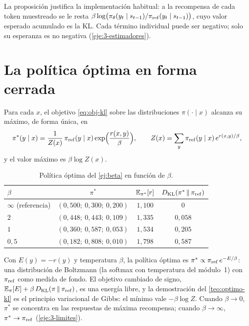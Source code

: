 La proposición justifica la implementación habitual: a la recompensa de cada token muestreado se le resta $\beta\log\bigl(\pi_\theta(y_t\mid s_{t-1})/\pi_{\mathrm{ref}}(y_t\mid s_{t-1})\bigr)$, cuyo valor esperado acumulado es la KL. Cada término individual puede ser negativo; solo su esperanza es no negativa (\cref{eje:3-estimadores}).

\addtocounter{definicion}{1}%

\section{La política óptima en forma cerrada}

\begin{teorema}\label{teo:optimo-kl}
Para cada $x$, el objetivo \eqref{eq:obj-kl} sobre las distribuciones $\pi(\cdot\mid x)$ alcanza su máximo, de forma única, en
\[
\pi^{*}(y\mid x)=\frac{1}{Z(x)}\,\pi_{\mathrm{ref}}(y\mid x)\exp\Bigl(\frac{r(x,y)}{\beta}\Bigr),\qquad Z(x)=\sum_{y}\pi_{\mathrm{ref}}(y\mid x)\,e^{r(x,y)/\beta},
\]
y el valor máximo es $\beta\log Z(x)$.
\end{teorema}

\addtocounter{definicion}{1}%

\begin{table}[h]
\centering\small
\begin{tabular}{@{}lccc@{}}
\toprule
$\beta$ & $\pi^{*}$ & $\mathbb{E}_{\pi^{*}}[r]$ & $D_{\mathrm{KL}}(\pi^{*}\,\|\,\pi_{\mathrm{ref}})$ \\
\midrule
$\infty$ (referencia) & $(0{,}500;\ 0{,}300;\ 0{,}200)$ & $1{,}100$ & $0$ \\
$2$ & $(0{,}448;\ 0{,}443;\ 0{,}109)$ & $1{,}335$ & $0{,}058$ \\
$1$ & $(0{,}360;\ 0{,}587;\ 0{,}053)$ & $1{,}534$ & $0{,}205$ \\
$0{,}5$ & $(0{,}182;\ 0{,}808;\ 0{,}010)$ & $1{,}798$ & $0{,}587$ \\
\bottomrule
\end{tabular}
\caption{Política óptima del \cref{ej:beta} en función de $\beta$.}
\label{tab:beta}
\end{table}

\begin{observacion}\label{obs:boltzmann}
Con $E(y)=-r(y)$ y temperatura $\beta$, la política óptima es $\pi^{*}\propto\pi_{\mathrm{ref}}\,e^{-E/\beta}$: una distribución de Boltzmann (la softmax con temperatura del módulo~1) con $\pi_{\mathrm{ref}}$ como medida de fondo. El objetivo cambiado de signo, $\mathbb{E}_\pi[E]+\beta\,D_{\mathrm{KL}}(\pi\,\|\,\pi_{\mathrm{ref}})$, es una energía libre, y la demostración del \cref{teo:optimo-kl} es el principio variacional de Gibbs: el mínimo vale $-\beta\log Z$. Cuando $\beta\to 0$, $\pi^{*}$ se concentra en las respuestas de máxima recompensa; cuando $\beta\to\infty$, $\pi^{*}\to\pi_{\mathrm{ref}}$ (\cref{eje:3-limites}).
\end{observacion}

